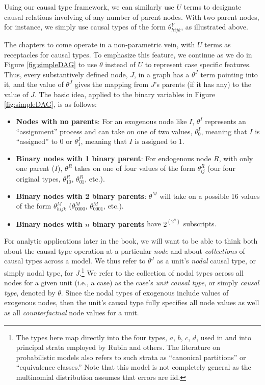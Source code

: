 \documentclass[
  12pt,
]{book}
\providecommand{\tightlist}{%
  \setlength{\itemsep}{0pt}\setlength{\parskip}{0pt}}
\begin{document}
Using our causal type framework, we can similarly use \(U\) terms to designate causal relations involving of any number of parent nodes. With two parent nodes, for instance, we simply use causal types of the form \(\theta^Y_{hijk}\), as illustrated above.

The chapters to come operate in a non-parametric vein, with \(U\) terms as receptacles for causal types. To emphasize this feature, we continue as we do in Figure \ref{fig:simpleDAG} to use \(\theta\) instead of \(U\) to represent case specific features. Thus, every substantively defined node, \(J\), in a graph has a \(\theta^J\) term pointing into it, and the value of \(\theta^J\) gives the mapping from \(J\)'s parents (if it has any) to the value of \(J\). The basic idea, applied to the binary variables in Figure \ref{fig:simpleDAG}, is as follows:

\begin{itemize}
\tightlist
\item
  \textbf{Nodes with no parents}: For an exogenous node like \(I\), \(\theta^I\) represents an ``assignment'' process and can take on one of two values, \(\theta^I_{0}\), meaning that \(I\) is ``assigned'' to \(0\) or \(\theta^I_{1}\), meaning that \(I\) is assigned to 1.
\item
  \textbf{Binary nodes with 1 binary parent}: For endogenous node \(R\), with only one parent (\(I\)), \(\theta^R\) takes on one of four values of the form \(\theta^R_{ij}\) (our four original types, \(\theta^R_{10}\), \(\theta^R_{01}\), etc.).
\item
  \textbf{Binary nodes with 2 binary parents}: \(\theta^M\) will take on a possible 16 values of the form \(\theta^M_{hijk}\) (\(\theta^M_{0000}\), \(\theta^M_{0001}\), etc.).
\item
  \textbf{Binary nodes with \(n\) binary parents} have \(2^\left(2^n\right)\) subscripts.
\end{itemize}

For analytic applications later in the book, we will want to be able to think both about the causal type operation at a particular \emph{node} and about \emph{collections} of causal types across a model. We thus refer to \(\theta^J\) as a unit's \emph{nodal} causal type, or simply nodal type, for \(J\).\footnote{The types here map directly into the four types, \(a\), \(b\), \(c\), \(d\), used in \citet{humphreys2015mixing} and into principal strata employed by Rubin and others. The literature on probabilistic models also refers to such strata as ``canonical partitions'' or ``equivalence classes.'' Note that this model is not completely general as the multinomial distribution assumes that errors are iid.} We refer to the collection of nodal types across all nodes for a given unit (i.e., a case) as the case's \emph{unit causal type}, or simply \emph{causal type}, denoted by \(\theta\). Since the nodal types of exogenous include values of exogenous nodes, then the unit's causal type fully specifies all node values as well as all \emph{counterfactual} node values for a unit.
\end{document}
